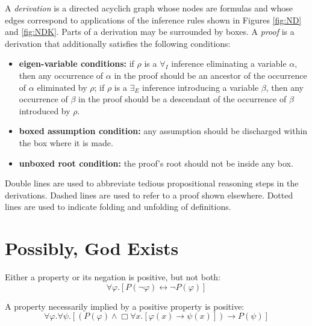 \documentclass{article}
\newcommand{\imp}{\rightarrow}
\newcommand{\biimp}{\leftrightarrow}
\newcommand{\all}{\forall}
\newcommand{\ex}{\exists}
\newcommand{\nec}{\Box} %
\begin{document}
\noindent
A \emph{derivation} is a directed acyclich graph whose nodes are formulas and whose edges correspond to applications of the inference rules shown in Figures \ref{fig:ND} and \ref{fig:NDK}. Parts of a derivation may be surrounded by boxes. A \emph{proof} is a derivation that additionally satisfies the following conditions:

\begin{itemize}
\item \textbf{eigen-variable conditions:}
if $\rho$ is a $\all_I$ inference eliminating a variable $\alpha$, then any occurrence of $\alpha$ in the proof should be an ancestor of the occurrence of $\alpha$ eliminated by $\rho$;
if $\rho$ is a $\ex_E$ inference introducing a variable $\beta$, then any occurrence of $\beta$ in the proof should be a descendant of the occurrence of $\beta$ introduced by $\rho$.
%
\item \textbf{boxed assumption condition:} any assumption should be discharged within the box where it is made.
%
\item \textbf{unboxed root condition:} the proof's root should not be inside any box.
\end{itemize}

\noindent
Double lines are used to abbreviate tedious propositional reasoning steps in the derivations. Dashed lines are used to refer to a proof shown elsewhere. Dotted lines are used to indicate folding and unfolding of definitions.

 



\section{Possibly, God Exists}

\begin{axiom}
\label{A1}
Either a property or its negation is positive, but not both:
$$
\all \varphi. [P(\neg \varphi) \biimp \neg P(\varphi)]
$$
\end{axiom}

\begin{axiom}
\label{A2}
A property necessarily implied by a positive property is positive:
$$
\all \varphi. \all \psi.[(P(\varphi) \wedge \nec \all x.[\varphi(x) \imp \psi(x)]) \imp P(\psi)]
$$
\end{axiom}
\end{document}
